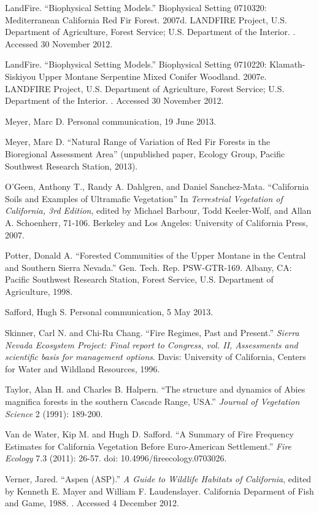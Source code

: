 \begin{hangparas}{.25in}{1}
LandFire. ``Biophysical Setting Models.'' Biophysical Setting 0710320: Mediterranean California Red Fir Forest. 2007d. LANDFIRE Project, U.S. Department of Agriculture, Forest Service; U.S. Department of the Interior. . Accessed 30 November 2012.

LandFire. ``Biophysical Setting Models.'' Biophysical Setting 0710220: Klamath-Siskiyou Upper Montane Serpentine Mixed Conifer Woodland. 2007e. LANDFIRE Project, U.S. Department of Agriculture, Forest Service; U.S. Department of the Interior. . Accessed 30 November 2012.

Meyer, Marc D. Personal communication, 19 June 2013.

Meyer, Marc D. ``Natural Range of Variation of Red Fir Forests in the Bioregional Assessment Area'' (unpublished paper, Ecology Group, Pacific Southwest Research Station, 2013).

O'Geen, Anthony T., Randy A. Dahlgren, and Daniel Sanchez-Mata. ``California Soils and Examples of Ultramafic Vegetation'' In \emph{Terrestrial Vegetation of California, 3rd Edition}, edited by Michael Barbour, Todd Keeler-Wolf, and Allan A. Schoenherr, 71-106. Berkeley and Los Angeles: University of California Press, 2007. 

Potter, Donald A. ``Forested Communities of the Upper Montane in the Central and Southern Sierra Nevada.'' Gen. Tech. Rep. PSW-GTR-169. Albany, CA: Pacific Southwest Research Station, Forest Service, U.S. Department of Agriculture, 1998.

Safford, Hugh S. Personal communication, 5 May 2013.

Skinner, Carl N. and Chi-Ru Chang. ``Fire Regimes, Past and Present.'' \emph{Sierra Nevada Ecosystem Project: Final report to Congress, vol. II, Assessments and scientific basis for management options}. Davis: University of California, Centers for Water and Wildland Resources, 1996.

Taylor, Alan H. and Charles B. Halpern. ``The structure and dynamics of Abies magnifica forests in the southern Cascade Range, USA.'' \emph{Journal of Vegetation Science} 2 (1991): 189-200.

Van de Water, Kip M. and Hugh D. Safford. ``A Summary of Fire Frequency Estimates for California Vegetation Before Euro-American Settlement.'' \emph{Fire Ecology} 7.3 (2011): 26-57. doi: 10.4996/fireecology.0703026.

Verner, Jared. ``Aspen (ASP).'' \emph{A Guide to Wildlife Habitats of California}, edited by Kenneth E. Mayer and William F. Laudenslayer. California Deparment of Fish and Game, 1988. . Accessed 4 December 2012.

\end{hangparas}

